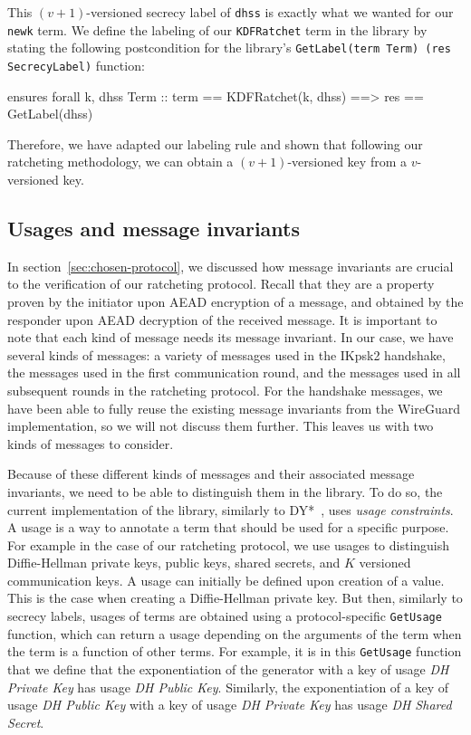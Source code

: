 This $(v+1)$-versioned secrecy label of \texttt{dhss} is exactly what we wanted for our \texttt{newk} term.
We define the labeling of our \texttt{KDFRatchet} term in the library by stating the following postcondition for the library's \texttt{GetLabel(term Term) (res SecrecyLabel)} function:
\begin{gobra}
ensures forall k, dhss Term ::
    term == KDFRatchet(k, dhss) ==> res == GetLabel(dhss)
\end{gobra}
Therefore, we have adapted our labeling rule and shown that following our ratcheting methodology, we can obtain a $(v+1)$-versioned key from a $v$-versioned key.

\subsection{Usages and message invariants}
\label{sec:usages-and-message-invariants}

In section~\ref{sec:chosen-protocol}, we discussed how message invariants are crucial to the verification of our ratcheting protocol.
Recall that they are a property proven by the initiator upon AEAD encryption of a message, and obtained by the responder upon AEAD decryption of the received message.
It is important to note that each kind of message needs its message invariant.
In our case, we have several kinds of messages: a variety of messages used in the IKpsk2 handshake, the messages used in the first communication round, and the messages used in all subsequent rounds in the ratcheting protocol.
For the handshake messages, we have been able to fully reuse the existing message invariants from the WireGuard implementation, so we will not discuss them further.
This leaves us with two kinds of messages to consider.

Because of these different kinds of messages and their associated message invariants, we need to be able to distinguish them in the library.
To do so, the current implementation of the library, similarly to DY*~\cite{bhargavan2021text}, uses \emph{usage constraints}.
A usage is a way to annotate a term that should be used for a specific purpose.
For example in the case of our ratcheting protocol, we use usages to distinguish Diffie-Hellman private keys, public keys, shared secrets, and $K$ versioned communication keys.
A usage can initially be defined upon creation of a value. This is the case when creating a Diffie-Hellman private key.
But then, similarly to secrecy labels, usages of terms are obtained using a protocol-specific \texttt{GetUsage} function, which can return a usage depending on the arguments of the term when the term is a function of other terms.
For example, it is in this \texttt{GetUsage} function that we define that the exponentiation of the generator with a key of usage \emph{DH Private Key} has usage \emph{DH Public Key}.
Similarly, the exponentiation of a key of usage \emph{DH Public Key} with a key of usage \emph{DH Private Key} has usage \emph{DH Shared Secret}.

